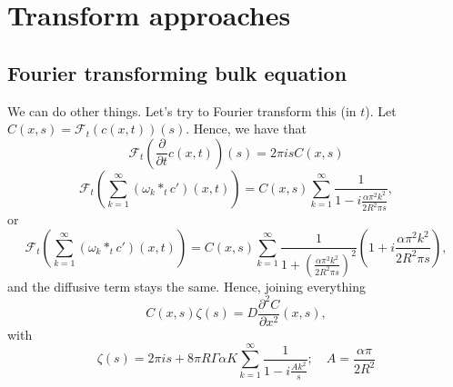 \documentclass[]{article}
\newcommand{\pderiv}[2]{\frac{\partial #1}{\partial #2}}
\begin{document}
\appendix
\section{Transform approaches}
\subsection{Fourier transforming bulk equation}
We can do other things. Let's try to Fourier transform this (in $t$). Let $C(x,s) = \mathcal{F}_t(c(x,t))(s)$. Hence, we have that
\begin{equation}
\mathcal{F}_t\left(\pderiv{}{t}c(x,t) \right)(s) = 2 \pi i s C(x,s)
\end{equation}
\begin{equation}
\mathcal{F}_t\left(\sum_{k=1}^\infty (\omega_k *_t c')(x,t)\right) = C(x,s) \sum_{k=1}^\infty \frac{1}{1 - i\frac{\alpha \pi^2 k^2}{2 R^2 \pi s}},
\end{equation}
or
\begin{equation}
\mathcal{F}_t\left(\sum_{k=1}^\infty (\omega_k *_t c')(x,t)\right) = C(x,s) \sum_{k=1}^\infty \frac{1}{1 + \left(\frac{\alpha \pi^2 k^2}{2 R^2 \pi s}\right)^2}\left(1 + i\frac{\alpha \pi^2 k^2}{2 R^2 \pi s}\right),
\end{equation}
and the diffusive term stays the same. Hence, joining everything
\begin{equation}
C(x,s) \zeta(s) = D \frac{\partial^2 C}{\partial x^2}(x,s),
\end{equation}
with
\begin{equation}
\zeta(s) = 2 \pi i s + 8 \pi R \Gamma \alpha K \sum_{k=1}^\infty \frac{1}{1 - i \frac{A k^2}{s}}; \quad A = \frac{\alpha \pi}{2 R^2}
\end{equation}
\end{document}
